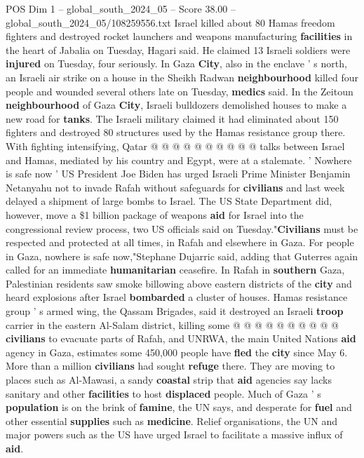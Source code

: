 \begin{textsample}{POS Dim 1 – global\_south\_2024\_05 – Score 38.00 – global\_south\_2024\_05/108259556.txt}
Israel killed about 80 Hamas freedom fighters and destroyed rocket launchers and weapons manufacturing \textbf{facilities} in the heart of Jabalia on Tuesday, Hagari said.
He claimed 13 Israeli soldiers were \textbf{injured} on Tuesday, four seriously.
In Gaza \textbf{City}, also in the enclave ' s north, an Israeli air strike on a house in the Sheikh Radwan \textbf{neighbourhood} killed four people and wounded several others late on Tuesday, \textbf{medics} said.
In the Zeitoun \textbf{neighbourhood} of Gaza \textbf{City}, Israeli bulldozers demolished houses to make a new road for \textbf{tanks}.
The Israeli military claimed it had eliminated about 150 fighters and destroyed 80 structures used by the Hamas resistance group there.
With fighting intensifying, Qatar @ @ @ @ @ @ @ @ @ @ talks between Israel and Hamas, mediated by his country and Egypt, were at a stalemate. ' Nowhere is safe now ' US President Joe Biden has urged Israeli Prime Minister Benjamin Netanyahu not to invade Rafah without safeguards for \textbf{civilians} and last week delayed a shipment of large bombs to Israel.
The US State Department did, however, move a \$1 billion package of weapons \textbf{aid} for Israel into the congressional review process, two US officials said on Tuesday."\textbf{Civilians} must be respected and protected at all times, in Rafah and elsewhere in Gaza.
For people in Gaza, nowhere is safe now,"Stephane Dujarric said, adding that Guterres again called for an immediate \textbf{humanitarian} ceasefire.
In Rafah in \textbf{southern} Gaza, Palestinian residents saw smoke billowing above eastern districts of the \textbf{city} and heard explosions after Israel \textbf{bombarded} a cluster of houses.
Hamas resistance group ' s armed wing, the Qassam Brigades, said it destroyed an Israeli \textbf{troop} carrier in the eastern Al-Salam district, killing some @ @ @ @ @ @ @ @ @ @ \textbf{civilians} to evacuate parts of Rafah, and UNRWA, the main United Nations \textbf{aid} agency in Gaza, estimates some 450,000 people have \textbf{fled} the \textbf{city} since May 6.
More than a million \textbf{civilians} had sought \textbf{refuge} there.
They are moving to places such as Al-Mawasi, a sandy \textbf{coastal} strip that \textbf{aid} agencies say lacks sanitary and other \textbf{facilities} to host \textbf{displaced} people.
Much of Gaza ' s \textbf{population} is on the brink of \textbf{famine}, the UN says, and desperate for \textbf{fuel} and other essential \textbf{supplies} such as \textbf{medicine}.
Relief organisations, the UN and major powers such as the US have urged Israel to facilitate a massive influx of \textbf{aid}.

\end{textsample}
